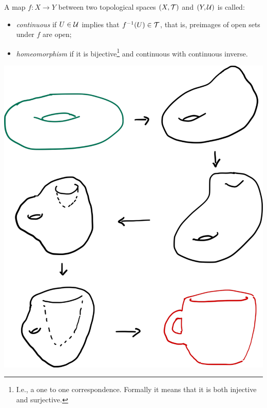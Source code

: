 \begin{definition}
  A map $f: X \to Y$ between two topological spaces $(X,\mathcal{T})$ and $(Y, \mathcal{U})$ is called:
  \begin{itemize}
    \item \emph{continuous} if $U\in\mathcal{U}$ implies that $f^{-1}(U)\in\mathcal{T}$, that is, preimages of open sets under $f$ are open;
    \item \emph{homeomorphism} if it is bijective\footnote{I.e., a one to one correspondence. Formally it means that it is both injective and surjective.} and continuous with continuous inverse.
  \end{itemize}
\end{definition}

\begin{marginfigure}
  \includegraphics{images/1_1-dount-to-cup.pdf}
  \vspace{5pt}
\end{marginfigure}


